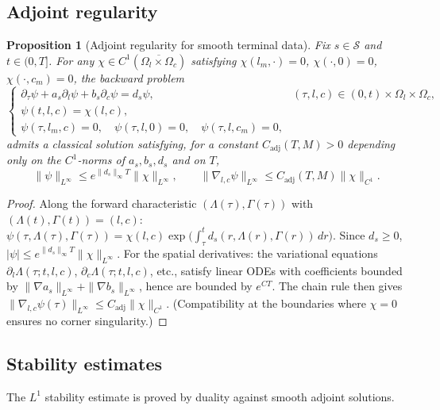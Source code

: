 \documentclass[pdflatex,sn-mathphys-num]{sn-jnl}%
\newtheorem{proposition}[theorem]{Proposition}
\begin{document}
\subsection{Adjoint regularity}
\begin{proposition}[Adjoint regularity for smooth terminal data]\label{prop:appA_adjoint}
Fix \(s\in\mathcal S\) and \(t\in(0,T]\). For any
\(\chi\in C^1(\overline{\Omega_l\times\Omega_c})\) satisfying
\(\chi(l_m,\cdot)=0\), \(\chi(\cdot,0)=0\), \(\chi(\cdot,c_m)=0\), the backward problem
\begin{equation}\label{eq:appA_adjoint}
\begin{cases}
\partial_\tau\psi+a_s\partial_l\psi+b_s\partial_c\psi=d_s\psi,
& (\tau,l,c)\in(0,t)\times\Omega_l\times\Omega_c,\\[1mm]
\psi(t,l,c)=\chi(l,c),\\[1mm]
\psi(\tau,l_m,c)=0,\quad \psi(\tau,l,0)=0,\quad \psi(\tau,l,c_m)=0,
\end{cases}
\end{equation}
admits a classical solution satisfying, for a constant \(C_{\mathrm{adj}}(T,M)>0\)
depending only on the \(C^1\)-norms of \(a_s,b_s,d_s\) and on \(T\),
\begin{equation}\label{eq:appA_adjoint_bounds}
\|\psi\|_{L^\infty}\le e^{\|d_s\|_\infty T}\|\chi\|_{L^\infty},
\qquad
\|\nabla_{l,c}\psi\|_{L^\infty}\le C_{\mathrm{adj}}(T,M)\|\chi\|_{C^1}.
\end{equation}
\end{proposition}
\begin{proof}
Along the forward characteristic \((\Lambda(\tau),\Gamma(\tau))\) with
\((\Lambda(t),\Gamma(t))=(l,c)\):
\(\psi(\tau,\Lambda(\tau),\Gamma(\tau))
=\chi(l,c)\exp\!\big(\int_\tau^t d_s(r,\Lambda(r),\Gamma(r))\,dr\big)\).
Since \(d_s\ge 0\), \(|\psi|\le e^{\|d_s\|_\infty T}\|\chi\|_{L^\infty}\).
For the spatial derivatives: the variational equations
\(\partial_{l}\Lambda(\tau;t,l,c)\), \(\partial_c\Lambda(\tau;t,l,c)\), etc.,
satisfy linear ODEs with coefficients bounded by
\(\|\nabla a_s\|_{L^\infty}+\|\nabla b_s\|_{L^\infty}\), hence are bounded by
\(e^{CT}\). The chain rule then gives
\(\|\nabla_{l,c}\psi(\tau)\|_{L^\infty}\le C_{\mathrm{adj}}\|\chi\|_{C^1}\).
(Compatibility at the boundaries where \(\chi=0\) ensures no corner singularity.)
\end{proof}

\subsection{Stability estimates}
The \(L^1\) stability estimate is proved by duality against smooth adjoint solutions.
\end{document}
